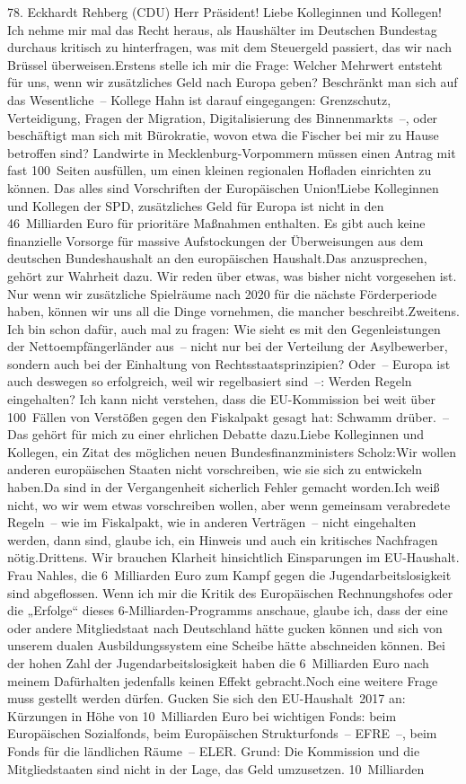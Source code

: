 \documentclass{article}
\begin{document}
	78. Eckhardt Rehberg (CDU) Herr Präsident! Liebe Kolleginnen und Kollegen! Ich nehme mir mal das Recht heraus, als Haushälter im Deutschen Bundestag durchaus kritisch zu hinterfragen, was mit dem Steuergeld passiert, das wir nach Brüssel überweisen.Erstens stelle ich mir die Frage: Welcher Mehrwert entsteht für uns, wenn wir zusätzliches Geld nach Europa geben? Beschränkt man sich auf das Wesentliche – Kollege Hahn ist darauf eingegangen: Grenzschutz, Verteidigung, Fragen der Migration, Digitalisierung des Binnenmarkts –, oder beschäftigt man sich mit Bürokratie, wovon etwa die Fischer bei mir zu Hause betroffen sind? Landwirte in Mecklenburg-Vorpommern müssen einen Antrag mit fast 100 Seiten ausfüllen, um einen kleinen regionalen Hofladen einrichten zu können. Das alles sind Vorschriften der Europäischen Union!Liebe Kolleginnen und Kollegen der SPD, zusätzliches Geld für Europa ist nicht in den 46 Milliarden Euro für prioritäre Maßnahmen enthalten. Es gibt auch keine finanzielle Vorsorge für massive Aufstockungen der Überweisungen aus dem deutschen Bundeshaushalt an den europäischen Haushalt.Das anzusprechen, gehört zur Wahrheit dazu. Wir reden über etwas, was bisher nicht vorgesehen ist. Nur wenn wir zusätzliche Spielräume nach 2020 für die nächste Förderperiode haben, können wir uns all die Dinge vornehmen, die mancher beschreibt.Zweitens. Ich bin schon dafür, auch mal zu fragen: Wie sieht es mit den Gegenleistungen der Nettoempfängerländer aus – nicht nur bei der Verteilung der Asylbewerber, sondern auch bei der Einhaltung von Rechtsstaatsprinzipien? Oder – Europa ist auch deswegen so erfolgreich, weil wir regelbasiert sind –: Werden Regeln eingehalten? Ich kann nicht verstehen, dass die EU-Kommission bei weit über 100 Fällen von Verstößen gegen den Fiskalpakt gesagt hat: Schwamm drüber. – Das gehört für mich zu einer ehrlichen Debatte dazu.Liebe Kolleginnen und Kollegen, ein Zitat des möglichen neuen Bundesfinanzministers Scholz:Wir wollen anderen europäischen Staaten nicht vorschreiben, wie sie sich zu entwickeln haben.Da sind in der Vergangenheit sicherlich Fehler gemacht worden.Ich weiß nicht, wo wir wem etwas vorschreiben wollen, aber wenn gemeinsam verabredete Regeln – wie im Fiskalpakt, wie in anderen Verträgen – nicht eingehalten werden, dann sind, glaube ich, ein Hinweis und auch ein kritisches Nachfragen nötig.Drittens. Wir brauchen Klarheit hinsichtlich Einsparungen im EU-Haushalt. Frau Nahles, die 6 Milliarden Euro zum Kampf gegen die Jugendarbeitslosigkeit sind abgeflossen. Wenn ich mir die Kritik des Europäischen Rechnungshofes oder die „Erfolge“ dieses 6-Milliarden-Programms anschaue, glaube ich, dass der eine oder andere Mitgliedstaat nach Deutschland hätte gucken können und sich von unserem dualen Ausbildungssystem eine Scheibe hätte abschneiden können. Bei der hohen Zahl der Jugendarbeitslosigkeit haben die 6 Milliarden Euro nach meinem Dafürhalten jedenfalls keinen Effekt gebracht.Noch eine weitere Frage muss gestellt werden dürfen. Gucken Sie sich den EU-Haushalt 2017 an: Kürzungen in Höhe von 10 Milliarden Euro bei wichtigen Fonds: beim Europäischen Sozialfonds, beim Europäischen Strukturfonds – EFRE –, beim Fonds für die ländlichen Räume – ELER. Grund: Die Kommission und die Mitgliedstaaten sind nicht in der Lage, das Geld umzusetzen. 10 Milliarden 
\end{document}
